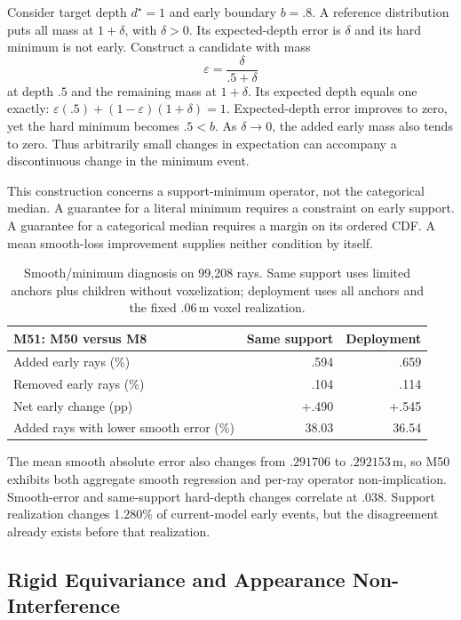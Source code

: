 Consider target depth $d^\star=1$ and early boundary $b=.8$.
A reference distribution puts all mass at $1+\delta$, with $\delta>0$.
Its expected-depth error is $\delta$ and its hard minimum is not early.
Construct a candidate with mass
\begin{equation}
\varepsilon=\frac{\delta}{.5+\delta}
\end{equation}
at depth $.5$ and the remaining mass at $1+\delta$.
Its expected depth equals one exactly:
$\varepsilon(.5)+(1-\varepsilon)(1+\delta)=1$.
Expected-depth error improves to zero, yet the hard minimum becomes $.5<b$.
As $\delta\to0$, the added early mass also tends to zero.
Thus arbitrarily small changes in expectation can accompany a discontinuous change in the minimum event.

This construction concerns a support-minimum operator, not the categorical median.
A guarantee for a literal minimum requires a constraint on early support.
A guarantee for a categorical median requires a margin on its ordered CDF.
A mean smooth-loss improvement supplies neither condition by itself.

\begin{table}[h]
\centering\small
\setlength{\tabcolsep}{4pt}
\begin{tabular}{p{.48\linewidth}rr}
\toprule
M51: M50 versus M8 & Same support & Deployment\\
\midrule
Added early rays (\%) & .594 & .659\\
Removed early rays (\%) & .104 & .114\\
Net early change (pp) & +.490 & +.545\\
Added rays with lower smooth error (\%) & 38.03 & 36.54\\
\bottomrule
\end{tabular}
\caption{Smooth/minimum diagnosis on 99,208 rays. Same support uses limited anchors plus children without
voxelization; deployment uses all anchors and the fixed $.06$\,m voxel realization.}
\end{table}

The mean smooth absolute error also changes from $.291706$ to $.292153$\,m,
so M50 exhibits both aggregate smooth regression and per-ray operator non-implication.
Smooth-error and same-support hard-depth changes correlate at $.038$.
Support realization changes 1.280\% of current-model early events, but the disagreement already exists
before that realization.

\subsection{Rigid Equivariance and Appearance Non-Interference}

